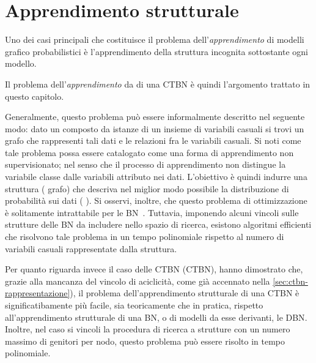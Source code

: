 
\chapter{Apprendimento strutturale}\label{cap:structurallearning}
Uno dei casi principali che costituisce il problema dell'\emph{apprendimento} di modelli grafico probabilistici è l'apprendimento della struttura incognita sottostante ogni modello.

Il problema dell'\emph{apprendimento } da \emph{} di una \acs{CTBN} è quindi l'argomento trattato in questo capitolo.

Generalmente, questo problema può essere informalmente descritto nel seguente modo: dato un  composto da istanze di un insieme di variabili casuali si trovi un grafo che rappresenti tali dati e le relazioni fra le variabili casuali. Si noti come tale problema possa essere catalogato come una forma di apprendimento non supervisionato; nel senso che il processo di apprendimento non distingue la variabile classe dalle variabili attributo nei dati. L'obiettivo è quindi indurre una struttura (\ie{} grafo) che descriva nel miglior modo possibile la distribuzione di probabilità sui dati (\ie{} \emph{}). Si osservi, inoltre, che questo problema di ottimizzazione è solitamente intrattabile per le \acl{BN}~\citep{Chickering1994}. Tuttavia, imponendo alcuni vincoli sulle strutture delle \acs{BN} da includere nello spazio di ricerca, esistono algoritmi efficienti che risolvono tale problema in un tempo polinomiale rispetto al numero di variabili casuali rappresentate dalla struttura.

Per quanto riguarda invece il caso delle \acl{CTBN} (\acs{CTBN}), \citet{Nodelman2002} hanno dimostrato che, grazie alla mancanza del vincolo di aciclicità, come già accennato nella \autoref{sec:ctbn-rappresentazione}), il problema dell'apprendimento strutturale di una \acs{CTBN} è significatibamente più facile, sia teoricamente che in pratica, rispetto all'apprendimento strutturale di una \acl{BN}, o di modelli da esse derivanti, \eg{} le \acf{DBN}. Inoltre, nel caso si vincoli la procedura di ricerca a strutture con un numero massimo di genitori per nodo, questo problema può essere risolto in tempo polinomiale.

